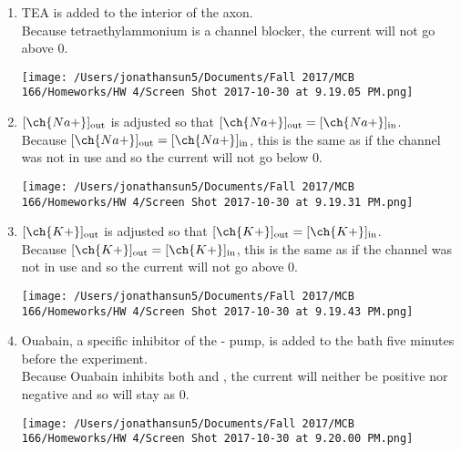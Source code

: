 \documentclass[11pt]{article}
\begin{document}
\begin{enumerate}[label=\arabic*.]
\begin{enumerate}[label=(\alph*)]
\item
TEA is added to the interior of the axon.
\vspace*{1\baselineskip}
\\
Because tetraethylammonium is a  channel blocker, the current will not go above 0.
\begin{center}
\texttt{[image: /Users/jonathansun5/Documents/Fall 2017/MCB 166/Homeworks/HW 4/Screen Shot 2017-10-30 at 9.19.05 PM.png]}
\end{center}



\item
$[\ch{Na+}]_{\text{out}}$ is adjusted so that $[\ch{Na+}]_{\text{out}} = [\ch{Na+}]_{\text{in}}$.
\vspace*{1\baselineskip}
\\
Because $[\ch{Na+}]_{\text{out}} = [\ch{Na+}]_{\text{in}}$, this is the same as if the  channel was not in use and so the current will not go below 0.
\begin{center}
\texttt{[image: /Users/jonathansun5/Documents/Fall 2017/MCB 166/Homeworks/HW 4/Screen Shot 2017-10-30 at 9.19.31 PM.png]}
\end{center}



\item
$[\ch{K+}]_{\text{out}}$ is adjusted so that $[\ch{K+}]_{\text{out}} = [\ch{K+}]_{\text{in}}$.
\vspace*{1\baselineskip}
\\
Because $[\ch{K+}]_{\text{out}} = [\ch{K+}]_{\text{in}}$, this is the same as if the  channel was not in use and so the current will not go above 0.
\begin{center}
\texttt{[image: /Users/jonathansun5/Documents/Fall 2017/MCB 166/Homeworks/HW 4/Screen Shot 2017-10-30 at 9.19.43 PM.png]}
\end{center}



\item
Ouabain, a specific inhibitor of the - pump, is added to the bath five minutes before the experiment.
\vspace*{1\baselineskip}
\\
Because Ouabain inhibits both  and , the current will neither be positive nor negative and so will stay as 0.
\begin{center}
\texttt{[image: /Users/jonathansun5/Documents/Fall 2017/MCB 166/Homeworks/HW 4/Screen Shot 2017-10-30 at 9.20.00 PM.png]}
\end{center}
\end{enumerate}
\end{enumerate}
\end{document}
